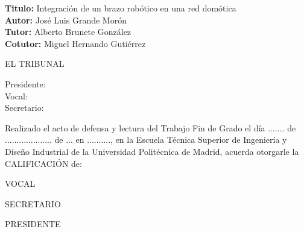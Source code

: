 \cleardoublepage

\begin{flushleft} \large
\textbf{Titulo:} Integración de un brazo robótico en una red domótica \\
\textbf{Autor:} José Luis Grande Morón\\
\textbf{Tutor:} Alberto Brunete González \\ 
\textbf{Cotutor:} Miguel Hernando Gutiérrez\\  [1 cm]

\end{flushleft} 

\begin{center} \LARGE
EL TRIBUNAL \\ [1 cm]
\end{center}

\begin{flushleft} \LARGE
Presidente: \\ [1 cm]
Vocal: \\ [1 cm]
Secretario: \\ [1.5 cm]
\end{flushleft}

\large
Realizado el acto de defensa y lectura del Trabajo Fin de Grado el día ....... de ....................   de ... en .........., en la Escuela Técnica Superior de Ingeniería y Diseño Industrial de la Universidad Politécnica de Madrid, acuerda otorgarle la CALIFICACIÓN de: \\ [2 cm]

\begin{center}
 \large VOCAL \\ [2.2 cm]
\end{center}

\begin{minipage}{0.5\textwidth}
 \begin{flushleft}
 \large SECRETARIO
\end{flushleft}
\end{minipage}
\begin{minipage}{0.5\textwidth}
\begin{flushright}
 \large PRESIDENTE
\end{flushright} 
\end{minipage}